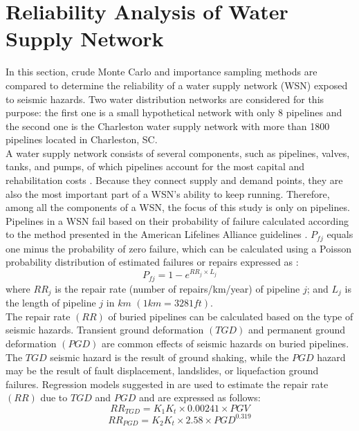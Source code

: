 \section{Reliability Analysis of Water Supply Network} 
    In this section, crude Monte Carlo and importance sampling methods are compared to determine the reliability of a water supply network (WSN) exposed to seismic hazards. Two water distribution networks are considered for this purpose: the first one is a small hypothetical network with only 8 pipelines and the second one is the Charleston water supply network with more than 1800 pipelines located in Charleston, SC.\\
    A water supply network consists of several components, such as pipelines, valves, tanks, and pumps, of which pipelines account for the most capital and rehabilitation costs \cite{kleiner_long-term_1998}. Because they connect supply and demand points, they are also the most important part of a WSN's ability to keep running. Therefore, among all the components of a WSN, the focus of this study is only on pipelines.\\
    Pipelines in a WSN fail based on their probability of failure calculated according to the method presented in the American Lifelines Alliance guidelines \cite{american_lifelines_alliance_ala_seismic_2001, american_lifelines_alliance_ala_seismic_2005}. $P_{fj}$ equals one minus the probability of zero failure, which can be calculated using a Poisson probability distribution of estimated failures or repairs expressed as \cite{fragiadakis_seismic_2014}: 
    $$P_{fj} = 1-e^{RR_j\times L_j}$$
    where $RR_j$ is the repair rate (number of repairs/km/year) of pipeline $j$; and $L_j$ is the length of pipeline $j$ in $km$ $(1 km = 3281 ft)$.\\ 
    The repair rate $(RR)$ of buried pipelines can be calculated based on the type of seismic hazards. Transient ground deformation $(TGD)$ and permanent ground deformation $(PGD)$ are common effects of seismic hazards on buried pipelines. The $TGD$ seismic hazard is the result of ground shaking, while the $PGD$ hazard may be the result of fault displacement, landslides, or liquefaction ground failures. Regression models suggested in \cite{american_lifelines_alliance_ala_seismic_2001} are used to estimate the repair rate $(RR)$ due to $TGD$ and $PGD$ and are expressed as follows:
    $$RR_{TGD}=K_{1}K_{t}\times 0.00241\times PGV$$
    $$RR_{PGD}=K_{2}K_{t}\times 2.58\times PGD^{0.319}$$
